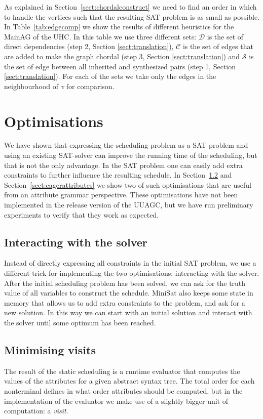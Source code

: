\documentclass{llncs}
\newcommand{\tabref}[1]{Table~\ref{#1}}
\newcommand{\sectref}[1]{Section~\ref{#1}}
\begin{document}
As explained in \sectref{sect:chordalconstruct} we need to find an order in which to handle the vertices such that the resulting SAT problem is as small as possible. In \tabref{tab:edgecomp} we show the results of different heuristics for the MainAG of the UHC. In this table we use three different sets: $\mathcal{D}$ is the set of direct dependencies (step 2, Section \ref{sect:translation}), $\mathcal{C}$ is the set of edges that are added to make the graph chordal (step 3, Section \ref{sect:translation}) and $\mathcal{S}$ is the set of edge between all inherited and synthesized pairs (step 1, Section \ref{sect:translation}). For each of the sets we take only the edges in the neighbourhood of \emph{v} for comparison.

\section{Optimisations} \label{sect:optimisations}
We have shown that expressing the scheduling problem as a SAT problem and using an existing SAT-solver can improve the running time of the scheduling, but that is not the only advantage. In the SAT problem one can easily add extra constraints to further influence the resulting schedule. In \sectref{sect:minimising} and \sectref{sect:eagerattributes} we show two of such optimisations that are useful from an attribute grammar perspective. These optimisations have not been implemented in the release version of the UUAGC, but we have run preliminary experiments to verify that they work as expected.

\subsection{Interacting with the solver}
Instead of directly expressing all constraints in the initial SAT problem, we use a different trick for implementing the two optimisations: interacting with the solver. After the initial scheduling problem has been solved, we can ask for the truth value of all variables to construct the schedule. MiniSat also keeps some state in memory that allows us to add extra constraints to the problem, and ask for a new solution. In this way we can start with an initial solution and interact with the solver until some optimum has been reached.

\subsection{Minimising visits} \label{sect:minimising}
The result of the static scheduling is a runtime evaluator that computes the values of the attributes for a given abstract syntax tree. The total order for each nonterminal defines in what order attributes should be computed, but in the implementation of the evaluator we make use of a slightly bigger unit of computation: a \emph{visit}.
\end{document}
